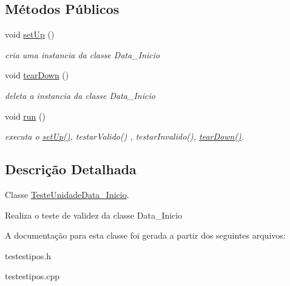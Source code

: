 \subsection*{\-Métodos \-Públicos}
\begin{DoxyCompactItemize}
\item 
\hypertarget{class_teste_unidade_data___inicio_aaddfb2e6b483890801372ab84f05bca2}{
void \hyperlink{class_teste_unidade_data___inicio_aaddfb2e6b483890801372ab84f05bca2}{set\-Up} ()}
\label{class_teste_unidade_data___inicio_aaddfb2e6b483890801372ab84f05bca2}

\begin{DoxyCompactList}\small\item\em cria uma instancia da classe \-Data\-\_\-\-Inicio \end{DoxyCompactList}\item 
\hypertarget{class_teste_unidade_data___inicio_a7f1e225037892bbc000bb492ac7a739f}{
void \hyperlink{class_teste_unidade_data___inicio_a7f1e225037892bbc000bb492ac7a739f}{tear\-Down} ()}
\label{class_teste_unidade_data___inicio_a7f1e225037892bbc000bb492ac7a739f}

\begin{DoxyCompactList}\small\item\em deleta a instancia da classe \-Data\-\_\-\-Inicio \end{DoxyCompactList}\item 
\hypertarget{class_teste_unidade_data___inicio_a9f86daa2f2c6807f91f77719b0ef7a0d}{
void \hyperlink{class_teste_unidade_data___inicio_a9f86daa2f2c6807f91f77719b0ef7a0d}{run} ()}
\label{class_teste_unidade_data___inicio_a9f86daa2f2c6807f91f77719b0ef7a0d}

\begin{DoxyCompactList}\small\item\em executa o \hyperlink{class_teste_unidade_data___inicio_aaddfb2e6b483890801372ab84f05bca2}{set\-Up()}, testar\-Valido() , testar\-Invalido(), \hyperlink{class_teste_unidade_data___inicio_a7f1e225037892bbc000bb492ac7a739f}{tear\-Down()}. \end{DoxyCompactList}\end{DoxyCompactItemize}


\subsection{\-Descrição \-Detalhada}
\-Classe \hyperlink{class_teste_unidade_data___inicio}{\-Teste\-Unidade\-Data\-\_\-\-Inicio}. 

\-Realiza o teste de validez da classe \-Data\-\_\-\-Inicio 

\-A documentação para esta classe foi gerada a partir dos seguintes arquivos\-:\begin{DoxyCompactItemize}
\item 
testestipos.\-h\item 
testestipos.\-cpp\end{DoxyCompactItemize}
